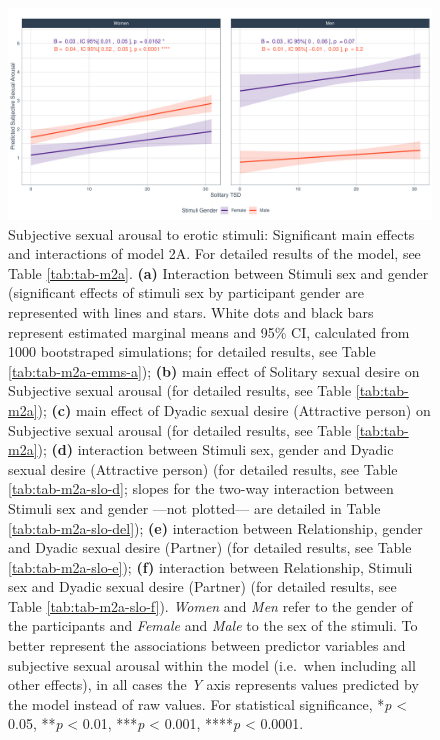 \documentclass[
  bookmarksnumbered]{article}
\begin{document}
\begin{figure}
\centering
\includegraphics{Sexual_Desire_Arousal_files/figure-latex/fig-h2a-1.pdf}
\caption{\label{fig:fig-h2a}Subjective sexual arousal to erotic stimuli: Significant main effects and interactions of model 2A. For detailed results of the model, see Table \ref{tab:tab-m2a}. \textbf{(a)} Interaction between Stimuli sex and gender (significant effects of stimuli sex by participant gender are represented with lines and stars. White dots and black bars represent estimated marginal means and 95\% CI, calculated from 1000 bootstraped simulations; for detailed results, see Table \ref{tab:tab-m2a-emms-a}); \textbf{(b)} main effect of Solitary sexual desire on Subjective sexual arousal (for detailed results, see Table \ref{tab:tab-m2a}); \textbf{(c)} main effect of Dyadic sexual desire (Attractive person) on Subjective sexual arousal (for detailed results, see Table \ref{tab:tab-m2a}); \textbf{(d)} interaction between Stimuli sex, gender and Dyadic sexual desire (Attractive person) (for detailed results, see Table \ref{tab:tab-m2a-slo-d}; slopes for the two-way interaction between Stimuli sex and gender ---not plotted--- are detailed in Table \ref{tab:tab-m2a-slo-del}); \textbf{(e)} interaction between Relationship, gender and Dyadic sexual desire (Partner) (for detailed results, see Table \ref{tab:tab-m2a-slo-e}); \textbf{(f)} interaction between Relationship, Stimuli sex and Dyadic sexual desire (Partner) (for detailed results, see Table \ref{tab:tab-m2a-slo-f}). \emph{Women} and \emph{Men} refer to the gender of the participants and \emph{Female} and \emph{Male} to the sex of the stimuli. To better represent the associations between predictor variables and subjective sexual arousal within the model (i.e.~when including all other effects), in all cases the \emph{Y} axis represents values predicted by the model instead of raw values. For statistical significance, *\emph{p} \textless{} 0.05, **\emph{p} \textless{} 0.01, ***\emph{p} \textless{} 0.001, ****\emph{p} \textless{} 0.0001.}
\end{figure}
\end{document}
